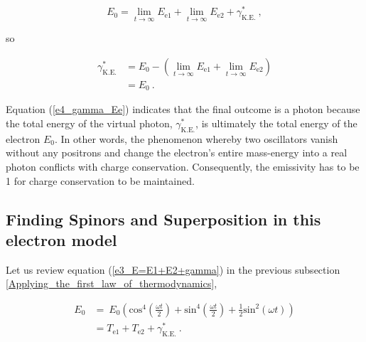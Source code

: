 \documentclass[%
 reprint,
 amsmath,amssymb,
 aps,
]{revtex4-1}
\numberwithin{equation}{section}
\begin{document}
        \begin{equation}
            E_{0} = \lim_{t \to \infty} E_{\mathrm{e1}} + \lim_{t \to \infty} E_{\mathrm{e2}} + \gamma^{*}_\mathrm{K.E.}
            \ ,
        \end{equation}

    so

        \begin{equation}
            \begin{split}
                \gamma^{*}_{\mathrm{K.E.}}
                    &= E_{0} - \left( \lim_{t \to \infty} E_{\mathrm{e1}} + \lim_{t \to \infty} E_{\mathrm{e2}} \right) \\
                    &= E_{0}
                    \ .
                \label{e4_gamma_Ee}
            \end{split}
        \end{equation}

    Equation (\ref{e4_gamma_Ee}) indicates that the final outcome is a photon because the total energy of the virtual photon, $\gamma^{*}_\mathrm{K.E.}$, is ultimately the total energy of the electron $E_{0}$. In other words, the phenomenon whereby two oscillators vanish without any positrons and change the electron's entire mass-energy into a real photon conflicts with charge conservation. Consequently, the emissivity has to be 1 for charge conservation to be maintained.

\subsection{Finding Spinors and Superposition in this electron model}
\label{Finding_spinors_and_superposition_in_this_electron_Model}

    Let us review equation (\ref{e3_E=E1+E2+gamma}) in the previous subsection \ref{Applying_the_first_law_of_thermodynamics},

        \begin{equation}
            \begin{split}
                E_{0}
                    &= \ E_{0} \left( \mathrm{cos}^{4} \left( \frac{\omega t}{2} \right) + \mathrm{sin}^{4} \left( \frac{\omega t}{2} \right) + \frac{1}{2} \mathrm{sin}^{2} (\omega t) \right) \\
                    &= T_{\mathrm{e1}} + T_{\mathrm{e2}} + \gamma^{*}_\mathrm{K.E.}
                    \ .
            \end{split}
            \label{e3_E=E1+E2+gamma_again}
        \end{equation}
\end{document}
